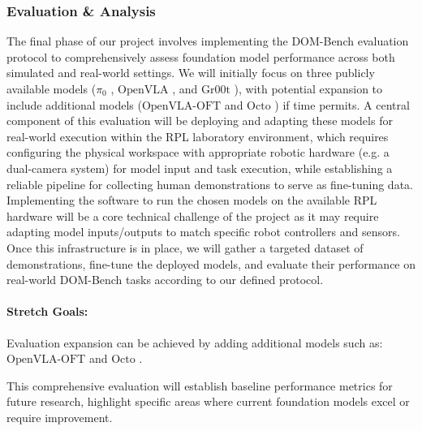 \subsubsection{Evaluation \& Analysis}
The final phase of our project involves implementing the DOM-Bench evaluation protocol to comprehensively assess foundation model performance across both simulated and real-world settings.
We will initially focus on three publicly available models ($\pi_0$ \cite{pi_zero}, $\text{OpenVLA}$ \cite{OpenVLA}, and $\text{Gr00t}$ \cite{Gr00tN1}),
with potential expansion to include additional models ($\text{OpenVLA-OFT}$ \cite{OpenVLA-OFT} and $\text{Octo}$ \cite{Octo}) if time permits.
A central component of this evaluation will be deploying and adapting these models for real-world execution within the RPL laboratory environment,
which requires configuring the physical workspace with appropriate robotic hardware (e.g. a dual-camera system)
for model input and task execution, while establishing a reliable pipeline for collecting human demonstrations to serve as fine-tuning data.
Implementing the software to run the chosen models on the available RPL hardware will be a core technical challenge of the project as it may require adapting model inputs/outputs to match specific robot controllers and sensors.
Once this infrastructure is in place, we will gather a targeted dataset of demonstrations,
fine-tune the deployed models, and evaluate their performance on real-world DOM-Bench tasks according to our defined protocol.


\paragraph{Stretch Goals:}

Evaluation expansion can be achieved by adding additional models such as: $\text{OpenVLA-OFT}$ \cite{OpenVLA-OFT} and $\text{Octo}$ \cite{Octo}.


This comprehensive evaluation will establish baseline performance metrics for future research, highlight specific areas where current foundation models excel or require improvement.
